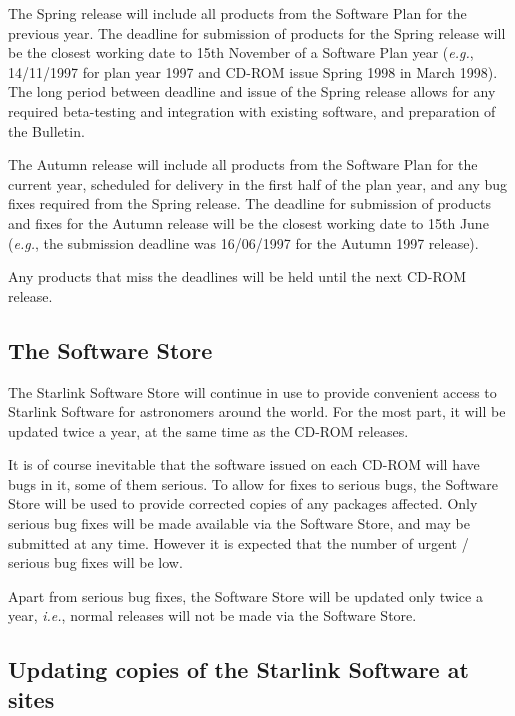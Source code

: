 \documentclass[twoside,11pt]{article}
\newcommand{\xlabel}[1]{}
\begin{document}
The Spring release will include all products from the Software Plan for the
previous year.  The deadline for submission of products for the
Spring release will be the closest working date to 15th November of a
Software Plan year (\emph{e.g.},\/ 14/11/1997 for plan year 1997 and
CD-ROM issue Spring 1998 in March 1998).  The long period between deadline
and issue of the Spring release allows for any required beta-testing and
integration with existing software, and preparation of the Bulletin.

The Autumn release will include all products from the Software Plan for the
current year, scheduled for delivery in the first half of the plan
year, and any bug fixes required from the Spring release.  The deadline for
submission of products and fixes for the Autumn release will be the closest
working date to 15th June (\emph{e.g.},\/ the submission deadline was 
16/06/1997 for the Autumn 1997 release).

Any products that miss the deadlines will be held until the next CD-ROM
release.

\subsection{\label{software_store}\xlabel{software_store}The Software Store}

The Starlink Software Store will continue in use to provide convenient
access to Starlink Software for astronomers around the world.  For the
most part, it will be updated twice a year, at the same time as the
CD-ROM releases.

It is of course inevitable that the software issued on each CD-ROM will
have bugs in it, some of them serious.  To allow for fixes to serious
bugs, the Software Store will be used to provide corrected copies of
any packages affected. Only serious bug fixes will be made available
via the Software Store, and may be submitted at any time.  However it
is expected that the number of urgent / serious bug fixes will be low.

Apart from serious bug fixes, the Software Store will be updated only
twice a year, \emph{i.e.},\/ normal releases will not be made via the
Software Store.

\subsection{\label{updating_copies_of_the_ussc_at_sites}\xlabel{updating_copies_of_the_ussc_at_sites}Updating copies of the Starlink Software at sites}
\end{document}

